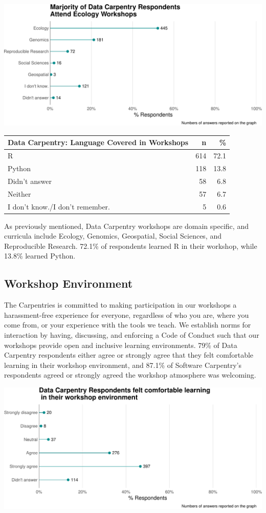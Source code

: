 \documentclass[]{article}
\begin{document}
\includegraphics[width=720]{figures/dc-workshop-type-plot-1}

\begin{longtable}[]{@{}lrr@{}}
\toprule
Data Carpentry: Language Covered in Workshops & n & \%\tabularnewline
\midrule
\endhead
R & 614 & 72.1\tabularnewline
Python & 118 & 13.8\tabularnewline
Didn't answer & 58 & 6.8\tabularnewline
Neither & 57 & 6.7\tabularnewline
I don't know./I don't remember. & 5 & 0.6\tabularnewline
\bottomrule
\end{longtable}

As previously mentioned, Data Carpentry workshops are domain specific,
and curricula include Ecology, Genomics, Geospatial, Social Sciences,
and Reproducible Research. 72.1\% of respondents learned R in their
workshop, while 13.8\% learned Python.

\subsection{Workshop Environment}\label{workshop-environment}

The Carpentries is committed to making participation in our workshops a
harassment-free experience for everyone, regardless of who you are,
where you come from, or your experience with the tools we teach. We
establish norms for interaction by having, discussing, and enforcing a
Code of Conduct such that our workshops provide open and inclusive
learning environments. 79\% of Data Carpentry respondents either agree
or strongly agree that they felt comfortable learning in their workshop
environment, and 87.1\% of Software Carpentry's respondents agreed or
strongly agreed the workshop atmosphere was welcoming.

\includegraphics[width=720]{figures/dc-post-workshop-comfortable-environment-1}
\end{document}
